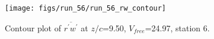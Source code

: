 \begin{figure}[H]
\centering
\texttt{[image: figs/run\_56/run\_56\_rw\_contour]}
\caption{Contour plot of $\overline{r^\prime w^\prime}$ at $z/c$=9.50, $V_{free}$=24.97, station 6.}
\label{fig:run_56_rw_contour}
\end{figure}


